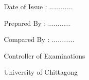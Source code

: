 \documentclass[11pt]{article}
\begin{document}
{\begin{table}[hb]
\begin{minipage}[b]{0.33\linewidth}
            \vspace*{1ex}
            \smallskip
            \noindent Date of Issue \hspace*{6ex}:  \hspace*{1ex} $\ldots \ldots \ldots \ldots$
            \end{minipage}
            \hspace{2.3cm}
            \begin{minipage}[b]{0.33\linewidth}
            \noindent Prepared By \hspace*{1.3ex}: \hspace*{1ex} $\ldots \ldots \ldots \ldots$\bigskip

            \vspace*{1.5ex}
            \smallskip
            \noindent Compared By : \hspace*{1ex} $\ldots \ldots \ldots \ldots$
            \end{minipage}
            \hspace*{1.2cm}
            \begin{minipage}[b]{0.19\linewidth} \centering
            Controller of Examinations  \hspace*{1ex}

            University of Chittagong
            \end{minipage}
            \end{table}

            \clearpage
            }

            
\end{document}
